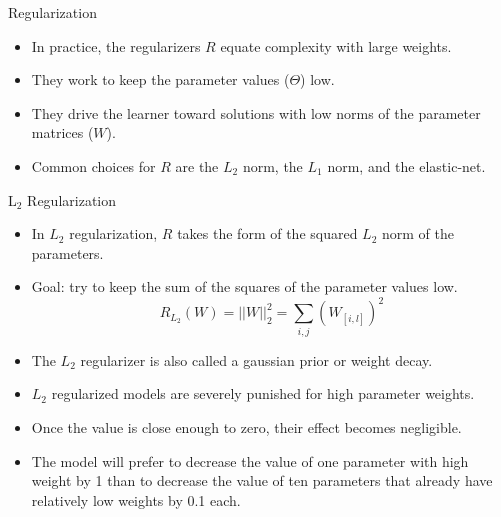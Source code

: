 \documentclass[handout]{beamer}
\begin{document}
\begin{frame}{Regularization}
\begin{scriptsize}
\begin{itemize}
  \item  In practice, the regularizers $R$ equate complexity with large weights.
  \item They work to keep the parameter values ($\Theta$) low.
  \item They drive the learner toward solutions with low norms of the parameter matrices ($W$).
  \item Common choices for $R$ are the $L_2$ norm, the $L_1$ norm, and the elastic-net.
\end{itemize}
\end{scriptsize}

\end{frame}


\begin{frame}{L$_2$ Regularization}
\begin{scriptsize}
\begin{itemize}
\item  In $L_2$ regularization, $R$ takes the form of the squared $L_2$ norm of the parameters.
\item Goal: try to keep the sum of the squares of the parameter values low.
  \begin{displaymath}
   R_{L_{2}}(W) = ||W||^{2}_{2} = \sum_{i,j}(W_{[i,l]})^2
  \end{displaymath}
\item The $L_2$ regularizer is also called a gaussian prior or weight decay.
\item $L_2$ regularized models are severely punished for high parameter weights.
\item Once the value is close enough to zero, their effect becomes negligible.
\item The model will prefer to decrease the value of one parameter with high weight by 1 than to decrease the value of ten parameters that already have relatively low weights by 0.1 each.
\end{itemize}
\end{scriptsize}

\end{frame}
\end{document}
